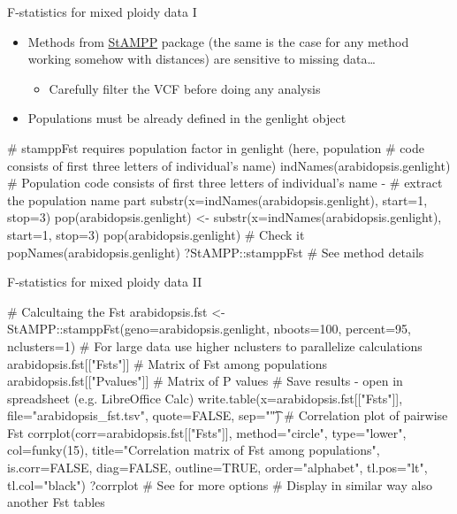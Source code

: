 \documentclass[compress, xelatex, 11pt, xcolor=svgnames, aspectratio=169,
	hyperref={
		bookmarks=true,
		unicode=true,
		colorlinks=true,
		pdftitle={Molecular data in R},
		plainpages=false,
		pdfauthor={Vojtech Zeisek},
		pdfsubject={Course about phylogeny and evolution in R},
		pdfcreator={XeLaTeX},
		pdfkeywords={R, evolution, phylogeny, molecular data},
		linkcolor=Crimson, %
		anchorcolor=Magenta, %
		citecolor=Magenta, %
		filecolor=Magenta, %
		menucolor=Magenta, %
		urlcolor=DodgerBlue, %
		},
	url={hyphens, lowtilde} %
	]{beamer}
\begin{document}
\begin{frame}[fragile]{F-statistics for mixed ploidy data I}
	\begin{itemize}
		\item Methods from \href{https://CRAN.R-project.org/package=StAMPP}{StAMPP} package (the same is the case for any method working somehow with distances) are sensitive to missing data\ldots
		\begin{itemize}
			\item Carefully filter the VCF before doing any analysis
		\end{itemize}
		\item Populations must be already defined in the genlight object
	\end{itemize}
	\begin{spluscode}
    # stamppFst requires population factor in genlight (here, population
    # code consists of first three letters of individual's name)
    indNames(arabidopsis.genlight)
    # Population code consists of first three letters of individual's name -
    # extract the population name part
    substr(x=indNames(arabidopsis.genlight), start=1, stop=3)
    pop(arabidopsis.genlight) <- substr(x=indNames(arabidopsis.genlight),
      start=1, stop=3)
    pop(arabidopsis.genlight) # Check it
    popNames(arabidopsis.genlight)
    ?StAMPP::stamppFst # See method details
	\end{spluscode}
\end{frame}

\begin{frame}[fragile]{F-statistics for mixed ploidy data II}
	\begin{spluscode}
    # Calcultaing the Fst
    arabidopsis.fst <- StAMPP::stamppFst(geno=arabidopsis.genlight,
      nboots=100, percent=95, nclusters=1)
    # For large data use higher nclusters to parallelize calculations
    arabidopsis.fst[["Fsts"]] # Matrix of Fst among populations
    arabidopsis.fst[["Pvalues"]] # Matrix of P values
    # Save results - open in spreadsheet (e.g. LibreOffice Calc)
    write.table(x=arabidopsis.fst[["Fsts"]], file="arabidopsis_fst.tsv",
      quote=FALSE, sep="\t")
    # Correlation plot of pairwise Fst
    corrplot(corr=arabidopsis.fst[["Fsts"]], method="circle", type="lower",
      col=funky(15), title="Correlation matrix of Fst among populations",
      is.corr=FALSE, diag=FALSE, outline=TRUE, order="alphabet", tl.pos="lt",
      tl.col="black")
    ?corrplot # See for more options
    # Display in similar way also another Fst tables
	\end{spluscode}
\end{frame}
\end{document}
